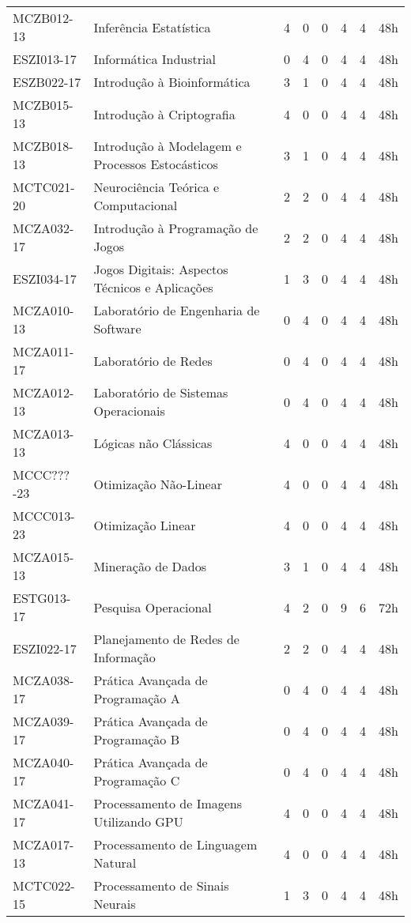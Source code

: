 \documentclass[a4paper]{article}
\begin{document}
\begin{longtable}{|l|l|llll|l|l|}
MCZB012-13 & Inferência Estatística & 4 & 0 & 0 & 4 & 4 & 48h \\
ESZI013-17 & Informática Industrial & 0 & 4 & 0 & 4 & 4 & 48h \\
ESZB022-17 & Introdução à Bioinformática & 3 & 1 & 0 & 4 & 4 & 48h \\
MCZB015-13 & Introdução à Criptografia & 4 & 0 & 0 & 4 & 4 & 48h \\
MCZB018-13 & Introdução à Modelagem e Processos Estocásticos & 3 & 1 & 0 & 4 & 4 & 48h \\
MCTC021-20 & Neurociência Teórica e Computacional & 2 & 2 & 0 & 4 & 4 & 48h \\
MCZA032-17 & Introdução à Programação de Jogos & 2 & 2 & 0 & 4 & 4 & 48h \\
ESZI034-17 & Jogos Digitais: Aspectos Técnicos e Aplicações & 1 & 3 & 0 & 4 & 4 & 48h \\
MCZA010-13 & Laboratório de Engenharia de Software & 0 & 4 & 0 & 4 & 4 & 48h \\
MCZA011-17 & Laboratório de Redes & 0 & 4 & 0 & 4 & 4 & 48h \\
MCZA012-13 & Laboratório de Sistemas Operacionais & 0 & 4 & 0 & 4 & 4 & 48h \\
MCZA013-13 & Lógicas não Clássicas & 4 & 0 & 0 & 4 & 4 & 48h \\
MCCC???-23 & Otimização Não-Linear & 4 & 0 & 0 & 4 & 4 & 48h \\ %
MCCC013-23 & Otimização Linear & 4 & 0 & 0 & 4 & 4 & 48h \\ %
MCZA015-13 & Mineração de Dados & 3 & 1 & 0 & 4 & 4 & 48h \\
ESTG013-17 & Pesquisa Operacional & 4 & 2 & 0 & 9 & 6 & 72h \\
ESZI022-17 & Planejamento de Redes de Informação & 2 & 2 & 0 & 4 & 4 & 48h \\
MCZA038-17 & Prática Avançada de Programação A & 0 & 4 & 0 & 4 & 4 & 48h \\
MCZA039-17 & Prática Avançada de Programação B & 0 & 4 & 0 & 4 & 4 & 48h \\
MCZA040-17 & Prática Avançada de Programação C & 0 & 4 & 0 & 4 & 4 & 48h \\
MCZA041-17 & Processamento de Imagens Utilizando GPU & 4 & 0 & 0 & 4 & 4 & 48h \\
MCZA017-13 & Processamento de Linguagem Natural & 4 & 0 & 0 & 4 & 4 & 48h \\
MCTC022-15 & Processamento de Sinais Neurais & 1 & 3 & 0 & 4 & 4 & 48h \\

\end{longtable}
\end{document}
